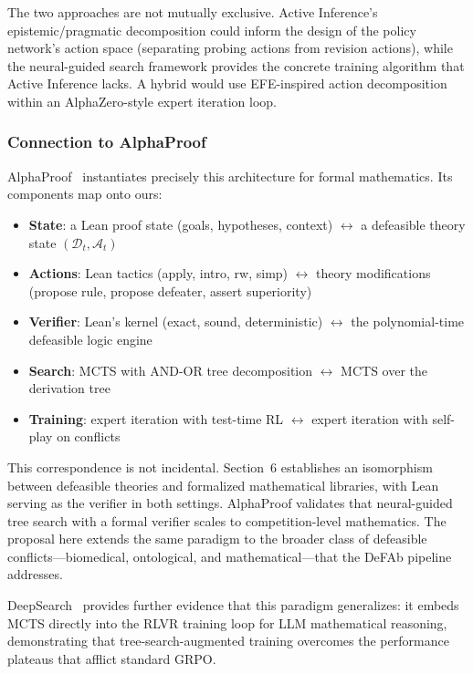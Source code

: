 \documentclass{article}
\newcommand{\D}{\mathcal{D}}
\begin{document}
The two approaches are not mutually exclusive. Active Inference's epistemic/pragmatic decomposition could inform the design of the policy network's action space (separating probing actions from revision actions), while the neural-guided search framework provides the concrete training algorithm that Active Inference lacks. A hybrid would use EFE-inspired action decomposition within an AlphaZero-style expert iteration loop.

\subsubsection{Connection to AlphaProof}

AlphaProof~\cite{alphaproof2025} instantiates precisely this architecture for formal mathematics. Its components map onto ours:

\begin{itemize}[nosep]
    \item \textbf{State}: a Lean proof state (goals, hypotheses, context) $\leftrightarrow$ a defeasible theory state $(\D_t, \mathcal{A}_t)$
    \item \textbf{Actions}: Lean tactics (apply, intro, rw, simp) $\leftrightarrow$ theory modifications (propose rule, propose defeater, assert superiority)
    \item \textbf{Verifier}: Lean's kernel (exact, sound, deterministic) $\leftrightarrow$ the polynomial-time defeasible logic engine
    \item \textbf{Search}: MCTS with AND-OR tree decomposition $\leftrightarrow$ MCTS over the derivation tree
    \item \textbf{Training}: expert iteration with test-time RL $\leftrightarrow$ expert iteration with self-play on conflicts
\end{itemize}

This correspondence is not incidental. Section~6 establishes an isomorphism between defeasible theories and formalized mathematical libraries, with Lean serving as the verifier in both settings. AlphaProof validates that neural-guided tree search with a formal verifier scales to competition-level mathematics. The proposal here extends the same paradigm to the broader class of defeasible conflicts---biomedical, ontological, and mathematical---that the DeFAb pipeline addresses.

DeepSearch~\cite{deepsearch2026} provides further evidence that this paradigm generalizes: it embeds MCTS directly into the RLVR training loop for LLM mathematical reasoning, demonstrating that tree-search-augmented training overcomes the performance plateaus that afflict standard GRPO.
\end{document}
